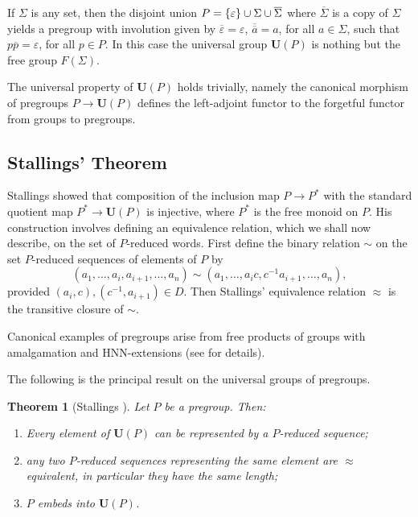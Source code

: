 \documentclass[a4paper]{article}
\newcommand\ov[1]{\overline{#1}} %
\newcommand\eps{\varepsilon}
\newcommand{\Uvec}{\mathbf{U}}	%
\newcommand{\UP}{\Uvec(P)}
\newcommand{\smallset}[1]{\left\{\mathinner{#1}\right\}}
\theoremstyle{plain}
\newtheorem{theorem}{Theorem}[section]
\theoremstyle{definition}
\begin{document}
If ${\Sigma}$ is any set, then
the disjoint union $P= \smallset{\eps} \cup \Sigma \cup \ov{\Sigma}$
where $\ov{\Sigma}$ is a copy of ${\Sigma}$
yields a pregroup with involution given by $\ov \eps=\eps$, $\ov{\ov{a}}=a$,
for all $a\in \Sigma$,  such that $p \ov{p} = \eps$,
for all $p\in P$.
In this case the universal
group $\UP$ is nothing but the free group $F(\Sigma)$.

The universal property of $\UP$ holds trivially, namely
the canonical morphism of pregroups $P \to \UP$ defines the
left-adjoint functor to the {forgetful}
functor from groups to pregroups.

\subsection{Stallings' Theorem}\label{sec:stall}
Stallings \cite{Stallings_1971} showed that composition of the
inclusion map $P \rightarrow P^\ast$
 with the standard quotient map $P^\ast \rightarrow \UP$ is injective,
where $P^\ast$ is the free monoid on $P$. His construction involves defining
an equivalence relation, which we shall now describe, on the set of 
$P$-reduced words.
First define the binary relation  $\sim$ on the set $P$-reduced sequences of elements
of $P$ by
$$(a_1,\ldots, a_i,a_{i+1},\ldots, a_n)\sim
(a_1,\ldots ,a_ic,c^{-1}a_{i+1},\ldots, a_n),$$
provided  $(a_i,c),(c^{-1},a_{i+1}) \in D.$
Then Stallings' equivalence relation $\approx$ is the transitive closure of $\sim$.

Canonical examples of pregroups arise from free products of groups with
amalgamation and HNN-extensions (see \cite{DiekertDuncanMiasnikov_2010} for details).


The following is the principal result on the universal groups of pregroups.

\begin{theorem} [Stallings \cite{Stallings_1971}]\label{thm:sup}
Let $P$ be a pregroup. Then:
\begin{enumerate}[1)]
\item Every element of $\UP$ can be  represented by
a $P$-reduced sequence;
\item  any two $P$-reduced sequences representing
the same element are $\approx$ equivalent, in particular they have the same length;\label{it:sup2}
\item $P$ embeds into  $\UP$.
\end{enumerate}
 \end{theorem}
\end{document}

